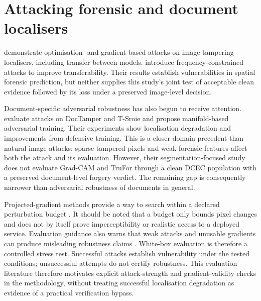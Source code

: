 \section{Attacking forensic and document localisers}
\label{sec:lr-loc-attacks}

\citet{cao2024transferable} demonstrate optimisation- and gradient-based attacks on image-tampering localisers, including transfer between models. \citet{zeng2024frequency} introduce frequency-constrained attacks to improve transferability. Their results establish vulnerabilities in spatial forensic prediction, but neither supplies this study's joint test of acceptable clean evidence followed by its loss under a preserved image-level decision.

Document-specific adversarial robustness has also begun to receive attention. \citet{shao2024documentrobustness} evaluate attacks on DocTamper and T-Sroie and propose manifold-based adversarial training. Their experiments show localisation degradation and improvements from defensive training. This is a closer domain precedent than natural-image attacks: sparse tampered pixels and weak forensic features affect both the attack and its evaluation. However, their segmentation-focused study does not evaluate Grad-CAM and TruFor through a clean DCEC population with a preserved document-level forgery verdict. The remaining gap is consequently narrower than adversarial robustness of documents in general.

Projected-gradient methods provide a way to search within a declared perturbation budget \citep{madry2018towards}. It should be noted that a budget only bounds pixel changes and does not by itself prove imperceptibility or realistic access to a deployed service. Evaluation guidance also warns that weak attacks and unusable gradients can produce misleading robustness claims \citep{carlini2019evaluating}. White-box evaluation is therefore a controlled stress test. Successful attacks establish vulnerability under the tested conditions; unsuccessful attempts do not certify robustness. This evaluation literature therefore motivates explicit attack-strength and gradient-validity checks in the methodology, without treating successful localisation degradation as evidence of a practical verification bypass.


